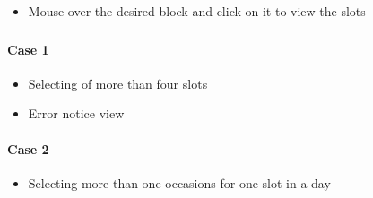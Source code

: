 \documentclass[letterpaper,10pt,english]{sphinxmanual}
\begin{document}
\begin{itemize}
\item {} 
Mouse over the desired block and click on it to view the slots

\end{itemize}



\subsubsection{}
\label{\detokenize{user_manual:anamolies-management}}

\paragraph{Case 1}
\label{\detokenize{user_manual:case-1}}\begin{itemize}
\item {} 
Selecting of more than four slots

\end{itemize}

\begin{itemize}
\item {} 
Error notice view

\end{itemize}



\paragraph{Case 2}
\label{\detokenize{user_manual:case-2}}\begin{itemize}
\item {} 
Selecting more than one occasions for one slot in a day

\end{itemize}
\end{document}

